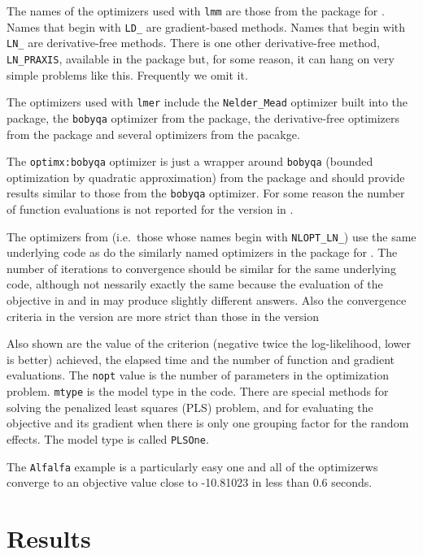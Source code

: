 \documentclass[article]{jss}
\begin{document}
The names of the optimizers used with \texttt{lmm} are those from the
 package for . Names that begin with \texttt{LD\_} are gradient-based
methods. Names that begin with \texttt{LN\_} are derivative-free
methods. There is one other derivative-free method, \texttt{LN\_PRAXIS},
available in the  package but, for some reason, it can
hang on very simple problems like this. Frequently we omit it.

The optimizers used with \texttt{lmer} include the \texttt{Nelder\_Mead}
optimizer built into the  package, the \texttt{bobyqa}
optimizer from the
 package, the derivative-free optimizers from the
 package and several optimizers from the
 pacakge.

The \texttt{optimx:bobyqa} optimizer is just a wrapper around
\texttt{bobyqa} (bounded optimization by quadratic approximation) from
the  package and should provide results similar to those
from the \texttt{bobyqa} optimizer. For some reason the number of
function evaluations is not reported for the version in .

The optimizers from  (i.e.~those whose names begin with
\texttt{NLOPT\_LN\_}) use the same underlying code as do the similarly
named optimizers in the  package for . The
number of iterations to convergence should be similar for the same
underlying code, although not nessarily exactly the same because the
evaluation of the objective in  and in  may
produce slightly different answers. Also the convergence criteria in the
 version are more strict than those in the 
version

Also shown are the value of the criterion (negative twice the
log-likelihood, lower is better) achieved, the elapsed time and the
number of function and gradient evaluations. The \texttt{nopt} value is
the number of parameters in the optimization problem. \texttt{mtype} is
the model type in the  code. There are special methods for
solving the penalized least squares (PLS) problem, and for evaluating
the objective and its gradient when there is only one grouping factor
for the random effects. The model type is called \texttt{PLSOne}.

The \texttt{Alfalfa} example is a particularly easy one and all of the
optimizerws converge to an objective value close to -10.81023 in less
than 0.6 seconds.

\section[Results]{Results}
\end{document}
